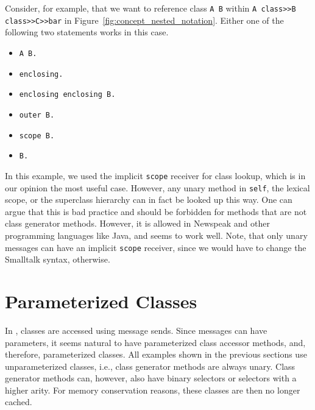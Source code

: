 Consider, for example, that we want to reference class \texttt{A B} within \texttt{A class>>B class>>C>>bar} in Figure~\ref{fig:concept_nested_notation}. Either one of the following two statements works in this case.

\begin{itemize}
	\item \texttt{A B.}
	\item \texttt{enclosing.}
	\item \texttt{enclosing enclosing B.}
	\item \texttt{outer B.}
	\item \texttt{scope B.}
	\item \texttt{B.}
\end{itemize}

In this example, we used the implicit \texttt{scope} receiver for class lookup, which is in our opinion the most useful case. However, any unary method in \texttt{self}, the lexical scope, or the superclass hierarchy can in fact be looked up this way. One can argue that this is bad practice and should be forbidden for methods that are not class generator methods. However, it is allowed in Newspeak and other programming languages like Java, and seems to work well. Note, that only unary messages can have an implicit \texttt{scope} receiver, since we would have to change the Smalltalk syntax, otherwise.

\section{Parameterized Classes}
In \msname, classes are accessed using message sends. Since messages can have parameters, it seems natural to have parameterized class accessor methods, and, therefore, parameterized classes. All examples shown in the previous sections use unparameterized classes, i.e., class generator methods are always unary. Class generator methods can, however, also have binary selectors or selectors with a higher arity. For memory conservation reasons, these classes are then no longer cached.

